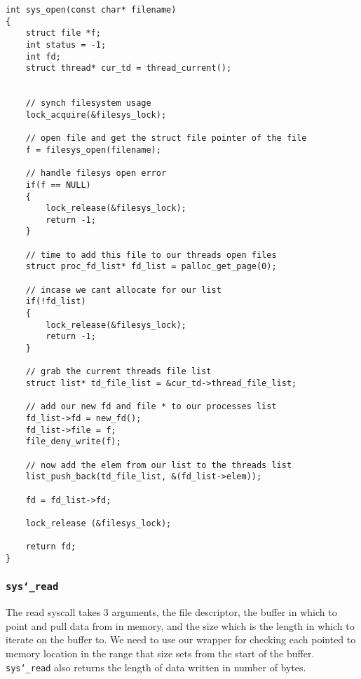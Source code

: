 \documentclass[]{article}
\begin{document}
			\lstset{language=C, tabsize=2}  
		    \begin{lstlisting}   
int sys_open(const char* filename)
{	
	struct file *f;
	int status = -1;
	int fd;
	struct thread* cur_td = thread_current();
	
	
	// synch filesystem usage
	lock_acquire(&filesys_lock);
	
	// open file and get the struct file pointer of the file
	f = filesys_open(filename);
	
	// handle filesys open error
	if(f == NULL)
	{
		lock_release(&filesys_lock);
		return -1;
	}

	// time to add this file to our threads open files
	struct proc_fd_list* fd_list = palloc_get_page(0);
	
	// incase we cant allocate for our list
	if(!fd_list)
	{
		lock_release(&filesys_lock);
		return -1;	
	} 

	// grab the current threads file list
	struct list* td_file_list = &cur_td->thread_file_list;

	// add our new fd and file * to our processes list
	fd_list->fd = new_fd();	
	fd_list->file = f;
	file_deny_write(f);
	
	// now add the elem from our list to the threads list
	list_push_back(td_file_list, &(fd_list->elem));

	fd = fd_list->fd;

	lock_release (&filesys_lock);
	
	return fd;		
}

		   \end{lstlisting}	  
		   
		   

		   
		   \newpage
		   
  \subsubsection{\texttt{sys\char`_read}}
  The read syscall takes 3 arguments, the file descriptor, the buffer in which to point and pull data from in memory, and the size which is the length in which to iterate on the buffer to. We need to use our wrapper for checking each pointed to memory location in the range that size sets from the start of the buffer. \texttt{sys\char`_read} also returns the length of data written in number of bytes.
  
\end{document}
